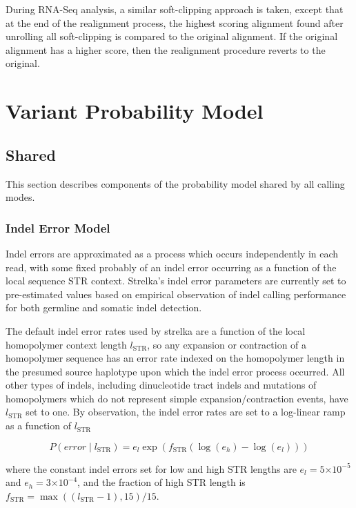 \documentclass{article}
\newcommand{\e}[1]{\ensuremath{\times 10^{#1}}}
\begin{document}
During RNA-Seq analysis, a similar soft-clipping approach is taken, except that at the end of the realignment process, the highest scoring alignment found after unrolling all soft-clipping is compared to the original alignment. If the original alignment has a higher score, then the realignment procedure reverts to the original.



\section{Variant Probability Model}


\subsection{Shared}

This section describes components of the probability model shared by all calling modes.

\subsubsection{Indel Error Model}
\label{sec:indel_error}
Indel errors are approximated as a process which occurs independently in each read, with some fixed probably of an indel error occurring as a function of the local sequence STR context. Strelka's indel error parameters are currently set to pre-estimated values based on empirical observation of indel calling performance for both germline and somatic indel detection.

The default indel error rates used by strelka are a function of the local homopolymer context length $l_{\text{STR}}$, so any expansion or contraction of a homopolymer sequence has an error rate indexed on the homopolymer length in the presumed source haplotype upon which the indel error process occurred. All other types of indels, including dinucleotide tract indels and mutations of homopolymers which do not represent simple expansion/contraction events, have $l_{\text{STR}}$ set to one. By observation, the indel error rates are set to a log-linear ramp as a function of $l_{\text{STR}}$

\begin{equation*}
P(error \mid l_{\text{STR}}) = e_{l} \exp(f_{\text{STR}}(\log(e_{h})-\log(e_{l})))
\end{equation*}

\noindent where the constant indel errors set for low and high STR lengths are $e_{l} = 5\e{-5}$ and $e_{h} = 3\e{-4}$, and the fraction of high STR length is $f_{\text{STR}} = \max((l_{\text{STR}}-1),15)/15$.
\end{document}
